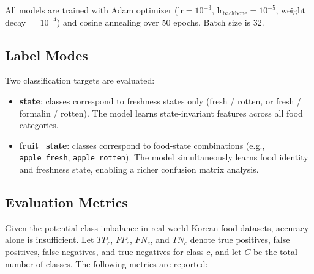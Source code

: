 \documentclass[12pt, a4paper]{article}
\begin{document}
All models are trained with Adam optimizer
($\text{lr} = 10^{-3}$, $\text{lr}_\text{backbone} = 10^{-5}$,
weight decay $= 10^{-4}$) and cosine annealing over 50 epochs.
Batch size is 32.

\subsection{Label Modes}

Two classification targets are evaluated:

\begin{itemize}
    \item \textbf{state}: classes correspond to freshness states only
    (fresh / rotten, or fresh / formalin / rotten). The model learns
    state-invariant features across all food categories.
    \item \textbf{fruit\_state}: classes correspond to food-state combinations
    (e.g., \texttt{apple\_fresh}, \texttt{apple\_rotten}). The model
    simultaneously learns food identity and freshness state, enabling a richer
    confusion matrix analysis.
\end{itemize}

\subsection{Evaluation Metrics}

Given the potential class imbalance in real-world Korean food datasets,
accuracy alone is insufficient.
Let $TP_c$, $FP_c$, $FN_c$, and $TN_c$ denote true positives, false positives,
false negatives, and true negatives for class $c$, and let $C$ be the total
number of classes.
The following metrics are reported:
\end{document}
